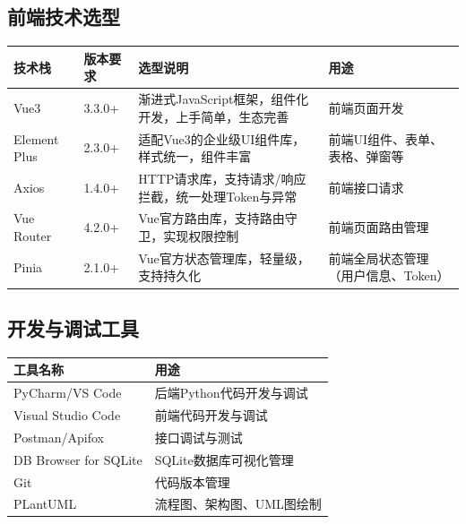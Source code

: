 \documentclass[12pt, a4paper]{article}
\begin{document}
\subsection{前端技术选型}

\begin{table}[H]
    \centering
    \begin{tabularx}{\linewidth}{|l|l|X|X|}
        \hline
        技术栈 & 版本要求 & 选型说明 & 用途 \\
        \hline
        Vue3 & 3.3.0+ & 渐进式JavaScript框架，组件化开发，上手简单，生态完善 & 前端页面开发 \\
        \hline
        Element Plus & 2.3.0+ & 适配Vue3的企业级UI组件库，样式统一，组件丰富 & 前端UI组件、表单、表格、弹窗等 \\
        \hline
        Axios & 1.4.0+ & HTTP请求库，支持请求/响应拦截，统一处理Token与异常 & 前端接口请求 \\
        \hline
        Vue Router & 4.2.0+ & Vue官方路由库，支持路由守卫，实现权限控制 & 前端页面路由管理 \\
        \hline
        Pinia & 2.1.0+ & Vue官方状态管理库，轻量级，支持持久化 & 前端全局状态管理（用户信息、Token） \\
        \hline
    \end{tabularx}
\end{table}

\subsection{开发与调试工具}

\begin{table}[H]
    \centering
    \begin{tabular}{|l|l|}
        \hline
        工具名称 & 用途 \\
        \hline
        PyCharm/VS Code & 后端Python代码开发与调试 \\
        \hline
        Visual Studio Code & 前端代码开发与调试 \\
        \hline
        Postman/Apifox & 接口调试与测试 \\
        \hline
        DB Browser for SQLite & SQLite数据库可视化管理 \\
        \hline
        Git & 代码版本管理 \\
        \hline
        PLantUML & 流程图、架构图、UML图绘制 \\
        \hline
    \end{tabular}
\end{table}
\end{document}
